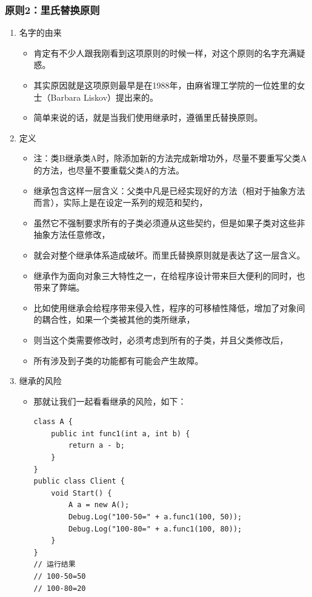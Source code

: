 \documentclass[9pt, b5paper]{article}
\begin{document}
\subsubsection{原则2：里氏替换原则}
\label{sec:orgd02ade0}
\begin{enumerate}
\item 名字的由来
\label{sec:org0d2d2d6}
\begin{itemize}
\item 肯定有不少人跟我刚看到这项原则的时候一样，对这个原则的名字充满疑惑。
\item 其实原因就是这项原则最早是在1988年，由麻省理工学院的一位姓里的女士（Barbara Liskov）提出来的。
\item 简单来说的话，就是当我们使用继承时，遵循里氏替换原则。
\end{itemize}
\item 定义
\label{sec:orgce139c8}
\begin{itemize}
\item 注：类B继承类A时，除添加新的方法完成新增功外，尽量不要重写父类A的方法，也尽量不要重载父类A的方法。
\item 继承包含这样一层含义：父类中凡是已经实现好的方法（相对于抽象方法而言），实际上是在设定一系列的规范和契约，
\item 虽然它不强制要求所有的子类必须遵从这些契约，但是如果子类对这些非抽象方法任意修改，
\item 就会对整个继承体系造成破坏。而里氏替换原则就是表达了这一层含义。
\item 继承作为面向对象三大特性之一，在给程序设计带来巨大便利的同时，也带来了弊端。
\item 比如使用继承会给程序带来侵入性，程序的可移植性降低，增加了对象间的耦合性，如果一个类被其他的类所继承，
\item 则当这个类需要修改时，必须考虑到所有的子类，并且父类修改后，
\item 所有涉及到子类的功能都有可能会产生故障。
\end{itemize}
\item 继承的风险
\label{sec:orgc6193ee}
\begin{itemize}
\item 那就让我们一起看看继承的风险，如下：
\begin{verbatim}
class A {
    public int func1(int a, int b) {
        return a - b;
    }
}
public class Client {
    void Start() {
        A a = new A();
        Debug.Log("100-50=" + a.func1(100, 50));
        Debug.Log("100-80=" + a.func1(100, 80));
    }
}
// 运行结果
// 100-50=50 
// 100-80=20
\end{verbatim}

\end{itemize}
\end{enumerate}
\end{document}
